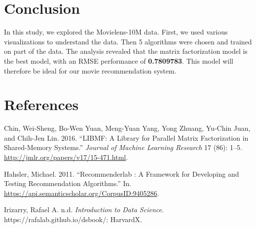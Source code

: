 \documentclass[
]{article}
\newlength{\cslhangindent}
\newenvironment{CSLReferences}[2] %
 {\begin{list}{}{%
  \setlength{\itemindent}{0pt}
  \setlength{\leftmargin}{0pt}
  \setlength{\parsep}{0pt}
  \ifodd #1
   \setlength{\leftmargin}{\cslhangindent}
   \setlength{\itemindent}{-1\cslhangindent}
  \fi
  \setlength{\itemsep}{#2\baselineskip}}}
 {\end{list}}
\begin{document}
\section{Conclusion}\label{conclusion}

In this study, we explored the Movielens-10M data. First, we used various visualizations to understand the data. Then 5 algorithms were chosen and trained on part of the data. The analysis revealed that the matrix factorization model is the best model, with an RMSE performance of \textbf{0.7809783}. This model will therefore be ideal for our movie recommendation system.

\section*{References}\label{references}

\label{refs}
\begin{CSLReferences}{1}{0}
Chin, Wei-Sheng, Bo-Wen Yuan, Meng-Yuan Yang, Yong Zhuang, Yu-Chin Juan, and Chih-Jen Lin. 2016. {``LIBMF: A Library for Parallel Matrix Factorization in Shared-Memory Systems.''} \emph{Journal of Machine Learning Research} 17 (86): 1--5. \url{http://jmlr.org/papers/v17/15-471.html}.

Hahsler, Michael. 2011. {``Recommenderlab : A Framework for Developing and Testing Recommendation Algorithms.''} In. \url{https://api.semanticscholar.org/CorpusID:9405286}.

Irizarry, Rafael A. n.d. \emph{Introduction to Data Science}. https://rafalab.github.io/dsbook/: HarvardX.

\end{CSLReferences}
\end{document}
